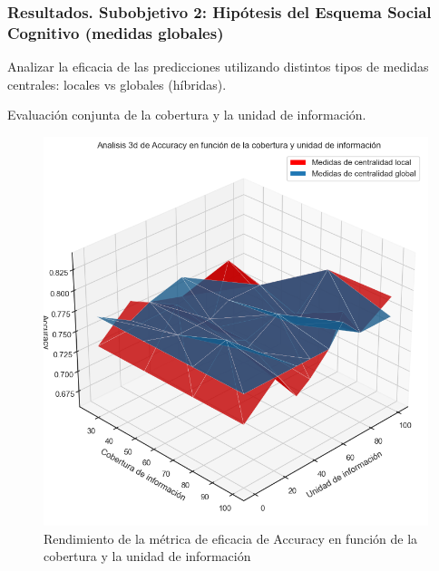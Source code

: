 \documentclass{beamer}
\begin{document}
\begin{frame}
	\frametitle{Resultados. Subobjetivo 2: Hipótesis del Esquema Social Cognitivo (medidas globales)}
\begin{block}{Analizar la eficacia de las predicciones utilizando
		distintos tipos de medidas centrales: locales vs globales (híbridas).}
		

	Evaluación conjunta de la cobertura y la unidad de información.
		\end{block}

\begin{figure}[H]
	\centering
	\includegraphics[width=0.45\linewidth]{figs/cap7/figura_46}
	\caption{Rendimiento de la métrica de eficacia de Accuracy en función de la cobertura y la unidad de información}
	
	\label{fig:figura227}
\end{figure}
	
\end{frame}
\end{document}
